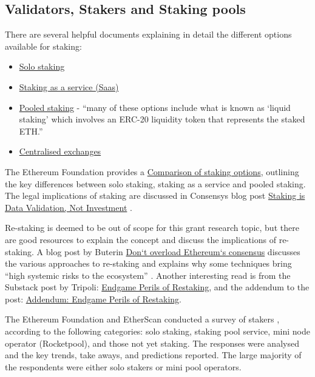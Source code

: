 \documentclass[UTF8]{article}
\begin{document}
\subsection{Validators, Stakers and Staking pools}
\label{sec:stakers}
There are several helpful documents explaining in detail the different options available for staking:
\begin{itemize}
\item \href{https://ethereum.org/en/staking/solo/}{Solo staking} \cite{efsolo}
\item \href{https://ethereum.org/en/staking/saas/}{Staking as a service (Saas)} \cite{efsaas}
\item \href{https://ethereum.org/en/staking/pools/}{Pooled staking} - ``many of these options include what is known as `liquid staking' which involves an ERC-20 liquidity token that represents the staked ETH.'' \cite{efpools} 
\item \href{https://ethereum.org/en/staking/}{Centralised exchanges} \cite{efstaking}
\end{itemize}

The Ethereum Foundation provides a \href{https://ethereum.org/en/staking/#comparison-of-options}{Comparison of staking options}, outlining the key differences between solo staking, staking as a service and pooled staking. The legal implications of staking are discussed in Consensys blog post \href{https://consensys.net/blog/news/staking-is-data-validation-not-investment/}{Staking is Data Validation, Not Investment} \cite{corva2023}.

Re-staking is deemed to be out of scope for this grant research topic, but there are good resources to explain the concept and discuss the implications of re-staking. A blog post by Buterin \href{https://vitalik.ca/general/2023/05/21/dont\_overload.html}{Don`t overload Ethereum`s consensus} discusses the various approaches to re-staking and explains why some techniques bring ``high systemic risks to the ecosystem'' \cite{buterin2023a}. Another interesting read is from the Substack post by Tripoli: \href{https://dataalways.substack.com/p/endgame-perils-of-restaking}{Endgame Perils of Restaking}, and the addendum to the post: \href{https://dataalways.substack.com/p/addendum-endgame-perils-of-restaking}{Addendum: Endgame Perils of Restaking}.

The Ethereum Foundation and EtherScan conducted a survey of stakers \cite{Smith2023}, according to the following categories: solo staking, staking pool service, mini node operator (Rocketpool), and those not yet staking. The responses were analysed and the key trends, take aways, and predictions reported. The large majority of the respondents were either solo stakers or mini pool operators.
\end{document}
